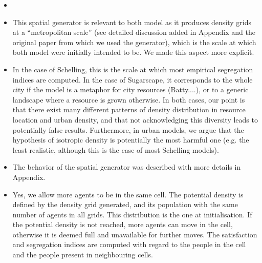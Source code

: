 \documentclass[11pt,a4paper,sans]{moderncv}        %
\begin{document}
\begin{itemize}
	\item {}
	
	\item This spatial generator is relevant to both model as it produces density grids at a ``metropolitan scale'' (see detailed discussion added in Appendix and the original paper from which we used the generator), which is the scale at which both model were initially intended to be. We made this aspect more explicit. 
	
	\item In the case of Schelling, this is the scale at which most empirical segregation indices are computed. In the case of Sugarscape, it corresponds to the whole city if the model is a metaphor for city resources (Batty....), or to a generic landscape where a resource is grown otherwise. In both cases, our point is that there exist many different patterns of density distribution in resource location and urban density, and that not acknowledging this diversity leads to potentially false results. Furthermore, in urban models, we argue that the hypothesis of isotropic density is potentially the most harmful one (e.g. the least realistic, although this is the case of most Schelling models).
	
	
	\item The behavior of the spatial generator was described with more details in Appendix.
	
	\item Yes, we allow more agents to be in the same cell. The potential density is defined by the density grid generated, and its population with the same number of agents in all grids. This distribution is the one at initialisation. If the potential density is not reached, more agents can move in the cell, otherwise it is deemed full and unavailable for further moves. The satisfaction and segregation indices are computed with regard to the people in the cell and the people present in neighbouring cells.
	

\end{itemize}
\end{document}
